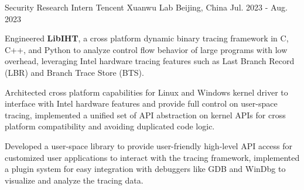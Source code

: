 \begin{cventries}
  \cventry
    {Security Research Intern} %
    {Tencent Xuanwu Lab} %
    {Beijing, China} %
    {Jul. 2023 - Aug. 2023} %
    {
      \begin{cvitems} %
        \item {Engineered \textbf{LibIHT}, a cross platform dynamic binary tracing framework in C, C++, and Python to analyze control flow behavior of large programs with low overhead, leveraging Intel hardware tracing features such as Last Branch Record (LBR) and Branch Trace Store (BTS).}
        \item {Architected cross platform capabilities for Linux and Windows kernel driver to interface with Intel hardware features and provide full control on user-space tracing, implemented a unified set of API abstraction on kernel APIs for cross platform compatibility and avoiding duplicated code logic.}
        \item {Developed a user-space library to provide user-friendly high-level API access for customized user applications to interact with the tracing framework, implemented a plugin system for easy integration with debuggers like GDB and WinDbg to visualize and analyze the tracing data.}
      \end{cvitems}
    }

\end{cventries}
